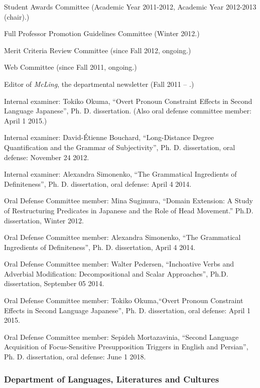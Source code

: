 \documentclass[11pt]{article}
\begin{document}
Student Awards Committee (Academic Year 2011-2012, Academic Year
2012-2013 (chair).)


Full Professor Promotion Guidelines Committee (Winter 2012.)


Merit Criteria Review Committee (since Fall 2012, ongoing.)

Web Committee  (since Fall 2011, ongoing.)

Editor of \textit{McLing}, the departmental newsletter (Fall 2011 --
.)

Internal examiner:  Tokiko Okuma, ``Overt Pronoun Constraint Effects in Second Language Japanese'', Ph. D. dissertation. (Also oral defense committee member: April 1 2015.)

Internal examiner:  David-\'Etienne Bouchard, ``Long-Distance Degree Quantification and the
Grammar of Subjectivity'', Ph. D. dissertation, oral defense: November
24 2012.

Internal examiner:  Alexandra Simonenko, ``The Grammatical Ingredients
of Definiteness'', Ph. D. dissertation, oral defense: April 4 2014.

Oral Defense Committee member: Mina Sugimura, ``Domain Extension:  A Study of Restructuring
Predicates in Japanese and the Role of Head Movement.''
Ph.D. dissertation, Winter 2012. 

Oral Defense Committee member:   Alexandra Simonenko, ``The Grammatical Ingredients
of Definiteness'', Ph. D. dissertation, April 4 2014.

Oral Defense Committee member:  Walter Pedersen, ``Inchoative Verbs and Adverbial Modification: Decompositional and Scalar Approaches'', Ph.D. dissertation, September 05 2014.

Oral Defense Committee member:  Tokiko Okuma,``Overt Pronoun Constraint Effects in Second Language Japanese'', Ph. D. dissertation, oral defense: April 1 2015.

Oral Defense Committee member: Sepideh Mortazavinia, ``Second Language Acquisition of Focus-Sensitive Presupposition Triggers in English and Persian'',  Ph. D. dissertation, oral defense: June 1 2018.


\vspace{-10pt}

\newpage

\subsubsection*{Department of Languages, Literatures and Cultures}
\end{document}
